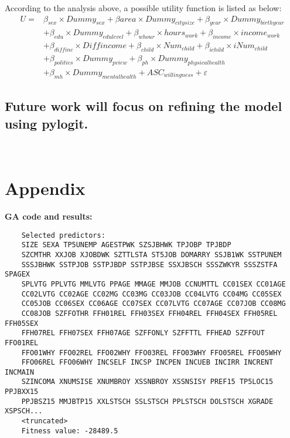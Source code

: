 \documentclass[12pt]{article}
\begin{document}
	According to the analysis above, a possible utility function is listed as below:
	\begin{equation}
	\begin{array}{ll}
	U=&\beta_{sex}\times Dummy_{sex} + \beta{area}\times Dummy_{citysize}+\beta_{year}\times Dummy_{birthyear}\\
	&+\beta_{edu}\times Dummy_{edulevel}+\beta_{whour}\times hours_{work}+\beta_{income}\times income_{work}\\
	&+\beta_{diffinc}\times Diffincome+\beta_{child}\times Num_{child}+\beta_{ichild}\times iNum_{child}\\
	&+\beta_{politics}\times Dummy_{pview}+\beta_{ph}\times Dummy_{physicalhealth}\\
	&+\beta_{mh}\times Dummy_{mentalhealth}+ASC_{willingness}+\varepsilon
	\end{array}
	\end{equation}
	\subsection*{Future work will focus on refining the model using pylogit.}
	\ 
	\section*{Appendix}\label{code}
	\textbf{GA code and results:}
	
	\begin{verbatim}
	Selected predictors: 
	SIZE SEXA TP5UNEMP AGESTPWK SZSJBHWK TPJOBP TPJBDP 
	SZCMTHR XXJOB XJOBDWK SZTTLSTA ST5JOB DOMARRY SSJB1WK SSTPUNEM 
	SSSJBHWK SSTPJOB SSTPJBDP SSTPJBSE SSXJBSCH SSSZWKYR SSSZSTFA SPAGEX 
	SPLVTG PPLVTG MMLVTG PPAGE MMAGE MMJOB CCNUMTTL CC01SEX CC01AGE
	CC02LVTG CC02AGE CC02MG CC03MG CC03JOB CC04LVTG CC04MG CC05SEX 
	CC05JOB CC06SEX CC06AGE CC07SEX CC07LVTG CC07AGE CC07JOB CC08MG 
	CC08JOB SZFFOTHR FFH01REL FFH03SEX FFH04REL FFH04SEX FFH05REL FFH05SEX
	FFH07REL FFH07SEX FFH07AGE SZFFONLY SZFFTTL FFHEAD SZFFOUT FFO01REL
	FFO01WHY FFO02REL FFO02WHY FFO03REL FFO03WHY FFO05REL FFO05WHY 
	FFO06REL FFO06WHY INCSELF INCSP INCPEN INCUEB INCIRR INCRENT INCMAIN
	SZINCOMA XNUMSISE XNUMBROY XSSNBROY XSSNSISY PREF15 TP5LOC15 PPJBXX15
	PPJBSZ15 MMJBTP15 XXLSTSCH SSLSTSCH PPLSTSCH DOLSTSCH XGRADE XSPSCH...
	<truncated>
	Fitness value: -28489.5 
	\end{verbatim}
\end{document}
